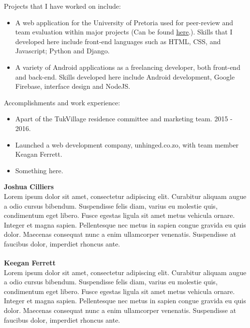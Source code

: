     \noindent
    Projects that I have worked on include:
    \begin{itemize}
        \item A web application for the University of Pretoria used for peer-review and team evaluation within major projects (Can be found \href{https://github.com/teampinocchio/pinocchio/wiki}{\underline{here}}.). Skills that I developed here include front-end languages such as HTML, CSS, and Javascript; Python and Django.
    
        \item A variety of Android applications as a freelancing developer, both front-end and back-end. Skills developed here include Android development, Google Firebase, interface design and NodeJS.
    \end{itemize}

	\noindent
	Accomplishments and work experience:
    \begin{itemize}
        \item Apart of the TukVillage residence committee and marketing team. 2015 - 2016.
        \item Launched a web development company, unhinged.co.zo, with team member Keagan Ferrett.
        \item Something here.
    \end{itemize}
\textbf{Joshua Cilliers}\\
Lorem ipsum dolor sit amet, consectetur adipiscing elit. Curabitur aliquam augue a odio cursus bibendum. Suspendisse felis diam, varius eu molestie quis, condimentum eget libero. Fusce egestas ligula sit amet metus vehicula ornare. Integer et magna sapien. Pellentesque nec metus in sapien congue gravida eu quis dolor. Maecenas consequat nunc a enim ullamcorper venenatis. Suspendisse at faucibus dolor, imperdiet rhoncus ante. \\ \\
\textbf{Keegan Ferrett}\\
Lorem ipsum dolor sit amet, consectetur adipiscing elit. Curabitur aliquam augue a odio cursus bibendum. Suspendisse felis diam, varius eu molestie quis, condimentum eget libero. Fusce egestas ligula sit amet metus vehicula ornare. Integer et magna sapien. Pellentesque nec metus in sapien congue gravida eu quis dolor. Maecenas consequat nunc a enim ullamcorper venenatis. Suspendisse at faucibus dolor, imperdiet rhoncus ante.


